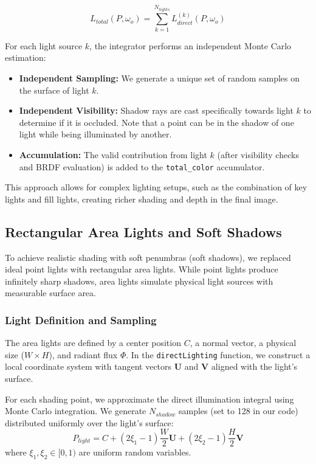 \documentclass[acmtog]{acmart}
\begin{document}
\begin{equation}
    L_{total}(P, \omega_o) = \sum_{k=1}^{N_{lights}} L_{direct}^{(k)}(P, \omega_o)
\end{equation}

For each light source $k$, the integrator performs an independent Monte Carlo estimation:
\begin{itemize}
    \item \textbf{Independent Sampling:} We generate a unique set of random samples on the surface of light $k$.
    \item \textbf{Independent Visibility:} Shadow rays are cast specifically towards light $k$ to determine if it is occluded. Note that a point can be in the shadow of one light while being illuminated by another.
    \item \textbf{Accumulation:} The valid contribution from light $k$ (after visibility checks and BRDF evaluation) is added to the \texttt{total\_color} accumulator.
\end{itemize}

This approach allows for complex lighting setups, such as the combination of key lights and fill lights, creating richer shading and depth in the final image.
\subsection{Rectangular Area Lights and Soft Shadows}

To achieve realistic shading with soft penumbras (soft shadows), we replaced ideal point lights with rectangular area lights. While point lights produce infinitely sharp shadows, area lights simulate physical light sources with measurable surface area.

\subsubsection{Light Definition and Sampling}
The area lights are defined by a center position $C$, a normal vector, a physical size ($W \times H$), and radiant flux $\Phi$. In the \texttt{directLighting} function, we construct a local coordinate system with tangent vectors $\mathbf{U}$ and $\mathbf{V}$ aligned with the light's surface.

For each shading point, we approximate the direct illumination integral using Monte Carlo integration. We generate $N_{shadow}$ samples (set to 128 in our code) distributed uniformly over the light's surface:
\begin{equation}
    P_{light} = C + (2\xi_1 - 1)\frac{W}{2}\mathbf{U} + (2\xi_2 - 1)\frac{H}{2}\mathbf{V}
\end{equation}
where $\xi_1, \xi_2 \in [0, 1)$ are uniform random variables.
\end{document}
